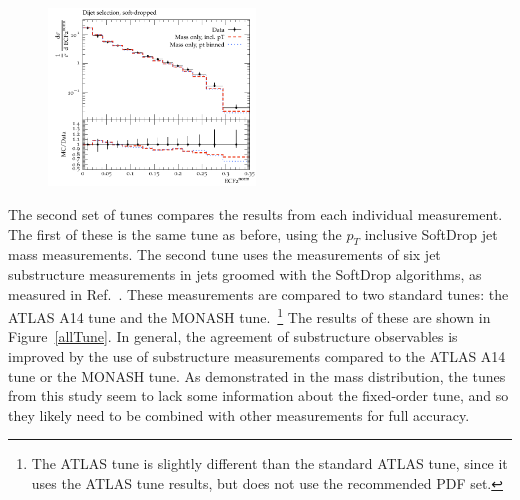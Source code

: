 \begin{figure}
\begin{center}
\includegraphics[width=0.49\textwidth]{figs/RivetPlotsMassOnly/ATLAS_2019_I1724098/d27-x01-y01.pdf} \hfill
\end{center}
\label{massOnlyTune}
\end{figure}


The second set of tunes compares the results from each individual measurement. The first of these is the same tune as before, using the $p_T$ inclusive SoftDrop jet mass measurements.
The second tune uses the measurements of six jet substructure measurements in jets groomed with the SoftDrop algorithms, as measured in Ref.~\cite{Aaboud:2019aii}.
These measurements are compared to two standard tunes: the ATLAS A14 tune and the MONASH tune.~\footnote{The ATLAS tune is slightly different than the standard ATLAS tune, since it uses the ATLAS tune results, but does not use the recommended PDF set.}
The results of these are shown in Figure~\ref{allTune}. 
In general, the agreement of substructure observables is improved by the use of substructure measurements compared to the ATLAS A14 tune or the MONASH tune.
As demonstrated in the mass distribution, the tunes from this study seem to lack some information about the fixed-order tune, 
and so they likely need to be combined with other measurements for full accuracy. 


